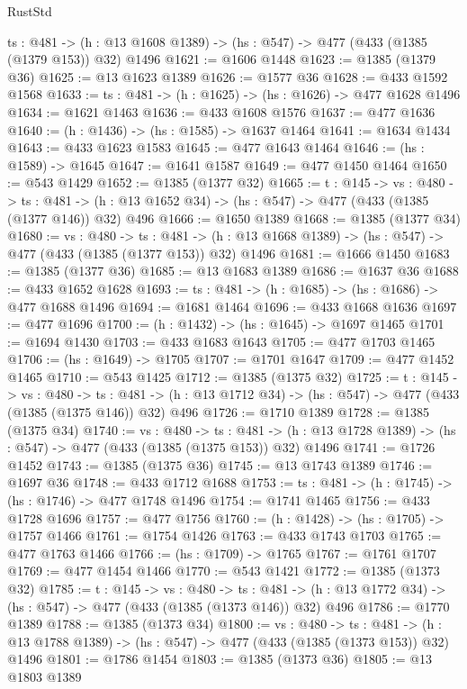 \begin{lexlean}{RustStd}
\begin{coremodule}
  {ts : @481} -> (h : @13 @1608 @1389) -> (hs : @547) -> @477 (@433 (@1385 (@1379 @153)) @32) @1496
@1621 := @1606 @1448
@1623 := @1385 (@1379 @36)
@1625 := @13 @1623 @1389
@1626 := @1577 @36
@1628 := @433 @1592 @1568
@1633 := {ts : @481} -> (h : @1625) -> (hs : @1626) -> @477 @1628 @1496
@1634 := @1621 @1463
@1636 := @433 @1608 @1576
@1637 := @477 @1636
@1640 := (h : @1436) -> (hs : @1585) -> @1637 @1464
@1641 := @1634 @1434
@1643 := @433 @1623 @1583
@1645 := @477 @1643 @1464
@1646 := (hs : @1589) -> @1645
@1647 := @1641 @1587
@1649 := @477 @1450 @1464
@1650 := @543 @1429
@1652 := @1385 (@1377 @32)
@1665 := {t : @145} ->
  {vs : @480} ->
  {ts : @481} -> (h : @13 @1652 @34) -> (hs : @547) -> @477 (@433 (@1385 (@1377 @146)) @32) @496
@1666 := @1650 @1389
@1668 := @1385 (@1377 @34)
@1680 := {vs : @480} ->
  {ts : @481} -> (h : @13 @1668 @1389) -> (hs : @547) -> @477 (@433 (@1385 (@1377 @153)) @32) @1496
@1681 := @1666 @1450
@1683 := @1385 (@1377 @36)
@1685 := @13 @1683 @1389
@1686 := @1637 @36
@1688 := @433 @1652 @1628
@1693 := {ts : @481} -> (h : @1685) -> (hs : @1686) -> @477 @1688 @1496
@1694 := @1681 @1464
@1696 := @433 @1668 @1636
@1697 := @477 @1696
@1700 := (h : @1432) -> (hs : @1645) -> @1697 @1465
@1701 := @1694 @1430
@1703 := @433 @1683 @1643
@1705 := @477 @1703 @1465
@1706 := (hs : @1649) -> @1705
@1707 := @1701 @1647
@1709 := @477 @1452 @1465
@1710 := @543 @1425
@1712 := @1385 (@1375 @32)
@1725 := {t : @145} ->
  {vs : @480} ->
  {ts : @481} -> (h : @13 @1712 @34) -> (hs : @547) -> @477 (@433 (@1385 (@1375 @146)) @32) @496
@1726 := @1710 @1389
@1728 := @1385 (@1375 @34)
@1740 := {vs : @480} ->
  {ts : @481} -> (h : @13 @1728 @1389) -> (hs : @547) -> @477 (@433 (@1385 (@1375 @153)) @32) @1496
@1741 := @1726 @1452
@1743 := @1385 (@1375 @36)
@1745 := @13 @1743 @1389
@1746 := @1697 @36
@1748 := @433 @1712 @1688
@1753 := {ts : @481} -> (h : @1745) -> (hs : @1746) -> @477 @1748 @1496
@1754 := @1741 @1465
@1756 := @433 @1728 @1696
@1757 := @477 @1756
@1760 := (h : @1428) -> (hs : @1705) -> @1757 @1466
@1761 := @1754 @1426
@1763 := @433 @1743 @1703
@1765 := @477 @1763 @1466
@1766 := (hs : @1709) -> @1765
@1767 := @1761 @1707
@1769 := @477 @1454 @1466
@1770 := @543 @1421
@1772 := @1385 (@1373 @32)
@1785 := {t : @145} ->
  {vs : @480} ->
  {ts : @481} -> (h : @13 @1772 @34) -> (hs : @547) -> @477 (@433 (@1385 (@1373 @146)) @32) @496
@1786 := @1770 @1389
@1788 := @1385 (@1373 @34)
@1800 := {vs : @480} ->
  {ts : @481} -> (h : @13 @1788 @1389) -> (hs : @547) -> @477 (@433 (@1385 (@1373 @153)) @32) @1496
@1801 := @1786 @1454
@1803 := @1385 (@1373 @36)
@1805 := @13 @1803 @1389

\end{coremodule}
\end{lexlean}
